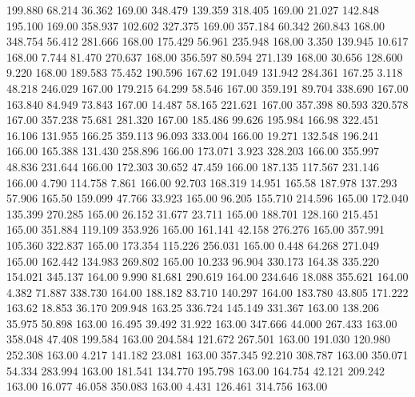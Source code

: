  199.880   68.214   36.362       169.00
 348.479  139.359  318.405       169.00
  21.027  142.848  195.100       169.00
 358.937  102.602  327.375       169.00
 357.184   60.342  260.843       168.00
 348.754   56.412  281.666       168.00
 175.429   56.961  235.948       168.00
   3.350  139.945   10.617       168.00
   7.744   81.470  270.637       168.00
 356.597   80.594  271.139       168.00
  30.656  128.600    9.220       168.00
 189.583   75.452  190.596       167.62
 191.049  131.942  284.361       167.25
   3.118   48.218  246.029       167.00
 179.215   64.299   58.546       167.00
 359.191   89.704  338.690       167.00
 163.840   84.949   73.843       167.00
  14.487   58.165  221.621       167.00
 357.398   80.593  320.578       167.00
 357.238   75.681  281.320       167.00
 185.486   99.626  195.984       166.98
 322.451   16.106  131.955       166.25
 359.113   96.093  333.004       166.00
  19.271  132.548  196.241       166.00
 165.388  131.430  258.896       166.00
 173.071    3.923  328.203       166.00
 355.997   48.836  231.644       166.00
 172.303   30.652   47.459       166.00
 187.135  117.567  231.146       166.00
   4.790  114.758    7.861       166.00
  92.703  168.319   14.951       165.58
 187.978  137.293   57.906       165.50
 159.099   47.766   33.923       165.00
  96.205  155.710  214.596       165.00
 172.040  135.399  270.285       165.00
  26.152   31.677   23.711       165.00
 188.701  128.160  215.451       165.00
 351.884  119.109  353.926       165.00
 161.141   42.158  276.276       165.00
 357.991  105.360  322.837       165.00
 173.354  115.226  256.031       165.00
   0.448   64.268  271.049       165.00
 162.442  134.983  269.802       165.00
  10.233   96.904  330.173       164.38
 335.220  154.021  345.137       164.00
   9.990   81.681  290.619       164.00
 234.646   18.088  355.621       164.00
   4.382   71.887  338.730       164.00
 188.182   83.710  140.297       164.00
 183.780   43.805  171.222       163.62
  18.853   36.170  209.948       163.25
 336.724  145.149  331.367       163.00
 138.206   35.975   50.898       163.00
  16.495   39.492   31.922       163.00
 347.666   44.000  267.433       163.00
 358.048   47.408  199.584       163.00
 204.584  121.672  267.501       163.00
 191.030  120.980  252.308       163.00
   4.217  141.182   23.081       163.00
 357.345   92.210  308.787       163.00
 350.071   54.334  283.994       163.00
 181.541  134.770  195.798       163.00
 164.754   42.121  209.242       163.00
  16.077   46.058  350.083       163.00
   4.431  126.461  314.756       163.00
